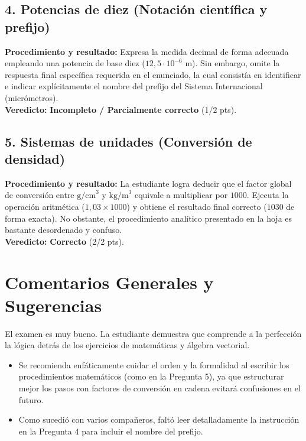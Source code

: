 \documentclass[12pt]{article}
\begin{document}
\subsection*{4. Potencias de diez (Notación científica y prefijo)}
\textbf{Procedimiento y resultado:} Expresa la medida decimal de forma adecuada empleando una potencia de base diez ($12,5 \cdot 10^{-6}$ m). Sin embargo, omite la respuesta final específica requerida en el enunciado, la cual consistía en identificar e indicar explícitamente el nombre del prefijo del Sistema Internacional (micrómetros). \\
\textbf{Veredicto:} \textbf{Incompleto / Parcialmente correcto} (1/2 pts).

\subsection*{5. Sistemas de unidades (Conversión de densidad)}
\textbf{Procedimiento y resultado:} La estudiante logra deducir que el factor global de conversión entre $\text{g/cm}^3$ y $\text{kg/m}^3$ equivale a multiplicar por $1000$. Ejecuta la operación aritmética ($1,03 \times 1000$) y obtiene el resultado final correcto ($1030$ de forma exacta). No obstante, el procedimiento analítico presentado en la hoja es bastante desordenado y confuso. \\
\textbf{Veredicto:} \textbf{Correcto} (2/2 pts).

\vspace{0.5cm}
\section*{Comentarios Generales y Sugerencias}
El examen es muy bueno. La estudiante demuestra que comprende a la perfección la lógica detrás de los ejercicios de matemáticas y álgebra vectorial.
\begin{itemize}
    \item Se recomienda enfáticamente cuidar el orden y la formalidad al escribir los procedimientos matemáticos (como en la Pregunta 5), ya que estructurar mejor los pasos con factores de conversión en cadena evitará confusiones en el futuro.
    \item Como sucedió con varios compañeros, faltó leer detalladamente la instrucción en la Pregunta 4 para incluir el nombre del prefijo.
\end{itemize}
\end{document}
